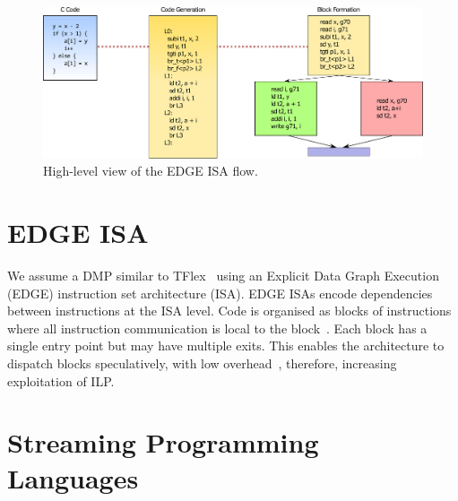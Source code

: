 
\begin{figure}[t]
    \centering
    \includegraphics[width=1\textwidth]{background/graphics/EDGE_3.pdf}
    \caption{High-level view of the EDGE ISA flow.}
    \label{fig:EdgeHigh}
\end{figure}
\section{EDGE ISA} We assume a DMP similar to TFlex~\cite{kim2007tflex} using an Explicit Data Graph Execution~\cite{burger04edge} (EDGE) instruction set architecture (ISA).
EDGE ISAs encode dependencies between instructions at the ISA level.
Code is organised as blocks of instructions where all instruction communication is local to the block~\cite{smith2006edge}.
Each block has a single entry point but may have multiple exits.
This enables the architecture to dispatch blocks speculatively, with low overhead~\cite{putnam2010e2,kim2007tflex}, therefore, increasing exploitation of ILP.

\section{Streaming Programming Languages}


